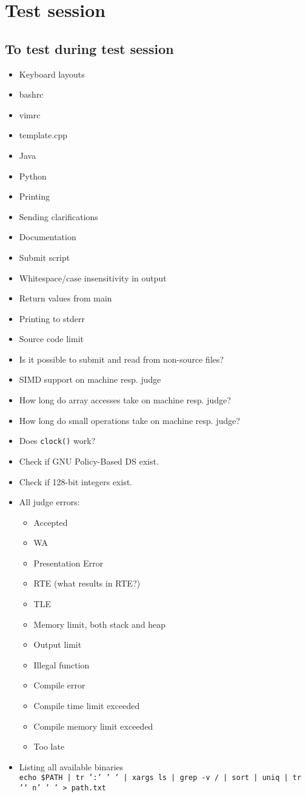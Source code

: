 \appendix
\chapter{Test session}

\section{To test during test session}
\begin{itemize}
	\item Keyboard layouts
	\item bashrc
	\item vimrc
	\item template.cpp
	\item Java
	\item Python
	\item Printing
	\item Sending clarifications
	\item Documentation
	\item Submit script
	\item Whitespace/case insensitivity in output
	\item Return values from main
	\item Printing to stderr
	\item Source code limit
	\item Is it possible to submit and read from non-source files?
	\item SIMD support on machine resp. judge
	\item How long do array accesses take on machine resp. judge?
	\item How long do small operations take on machine resp. judge?
	\item Does \texttt{clock()} work?
	\item Check if GNU Policy-Based DS exist.
	\item Check if 128-bit integers exist.
	\item All judge errors:
		\begin{itemize}
			\item Accepted
			\item WA
			\item Presentation Error
			\item RTE (what results in RTE?)
			\item TLE
			\item Memory limit, both stack and heap
			\item Output limit
			\item Illegal function
			\item Compile error
			\item Compile time limit exceeded
			\item Compile memory limit exceeded
			\item Too late
		\end{itemize}
	\item Listing all available binaries\\
		\texttt{echo \$PATH | tr ':' ' ' | xargs ls | grep -v / | sort | uniq | tr '\char`\\n' ' ' > path.txt}
\end{itemize}
